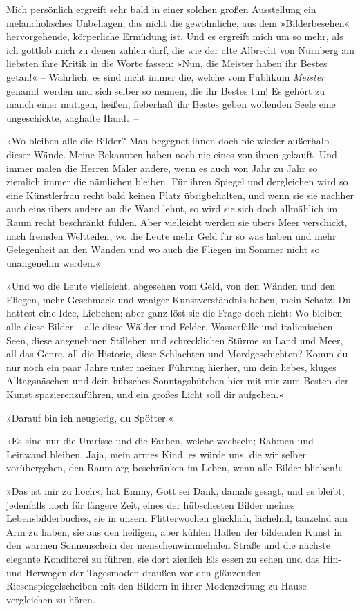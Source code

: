 Mich persönlich ergreift sehr bald in einer solchen großen
Ausstellung ein melancholisches Unbehagen, das nicht die
gewöhnliche, aus dem »Bilderbesehen« hervorgehende, körperliche
Ermüdung ist. Und es ergreift mich um so mehr, als ich gottlob mich
zu denen zahlen darf, die wie der alte Albrecht von Nürnberg am
liebsten ihre Kritik in die Worte fassen: »Nun, die Meister haben
ihr Bestes getan!« – Wahrlich, es sind nicht immer die, welche vom
Publikum \emph{Meister} genannt werden und sich selber so nennen,
die ihr Bestes tun! Es gehört zu manch einer mutigen, heißen,
fieberhaft ihr Bestes geben wollenden Seele eine ungeschickte,
zaghafte Hand.~–

»Wo bleiben alle die Bilder? Man begegnet ihnen doch nie wieder
außerhalb dieser Wände. Meine Bekannten haben noch nie eines von
ihnen gekauft. Und immer malen die Herren Maler andere, wenn es
auch von Jahr zu Jahr so ziemlich immer die nämlichen bleiben. Für
ihren Spiegel und dergleichen wird so eine Künstlerfrau recht bald
keinen Platz übrigbehalten, und wenn sie sie nachher auch eins
übers andere an die Wand lehnt, so wird sie sich doch allmählich im
Raum recht beschränkt fühlen. Aber vielleicht werden sie übers Meer
verschickt, nach fremden Weltteilen, wo die Leute mehr Geld für so
was haben und mehr Gelegenheit an den Wänden und wo auch die
Fliegen im Sommer nicht so unangenehm werden.«

»Und wo die Leute vielleicht, abgesehen vom Geld, von den Wänden
und den Fliegen, mehr Geschmack und weniger Kunstverständnis haben,
mein Schatz. Du hattest eine Idee, Liebchen; aber ganz löst sie die
Frage doch nicht: Wo bleiben alle diese Bilder – alle diese Wälder
und Felder, Wasserfälle und italienischen Seen, diese angenehmen
Stilleben und schrecklichen Stürme zu Land und Meer, all das Genre,
all die Historie, diese Schlachten und Mordgeschichten? Komm du nur
noch ein paar Jahre unter meiner Führung hierher, um dein liebes,
kluges Alltagsnäschen und dein hübsches Sonntagshütchen hier mit
mir zum Besten der Kunst spazierenzuführen, und ein großes Licht
soll dir aufgehen.«

»Darauf bin ich neugierig, du Spötter.«

»Es sind nur die Umrisse und die Farben, welche wechseln; Rahmen
und Leinwand bleiben. Jaja, mein armes Kind, es würde uns, die wir
selber vorübergehen, den Raum arg beschränken im Leben, wenn alle
Bilder blieben!«

»Das ist mir zu hoch«, hat Emmy, Gott sei Dank, damals gesagt, und
es bleibt, jedenfalls noch für längere Zeit, eines der hübschesten
Bilder meines Lebensbilderbuches, sie in unsern Flitterwochen
glücklich, lächelnd, tänzelnd am Arm zu haben, sie aus den
heiligen, aber kühlen Hallen der bildenden Kunst in den warmen
Sonnenschein der menschenwimmelnden Straße und die nächste elegante
Konditorei zu führen, sie dort zierlich Eis essen zu sehen und das
Hin- und Herwogen der Tagesmoden draußen vor den glänzenden
Riesenspiegelscheiben mit den Bildern in ihrer Modenzeitung zu
Hause vergleichen zu hören.

